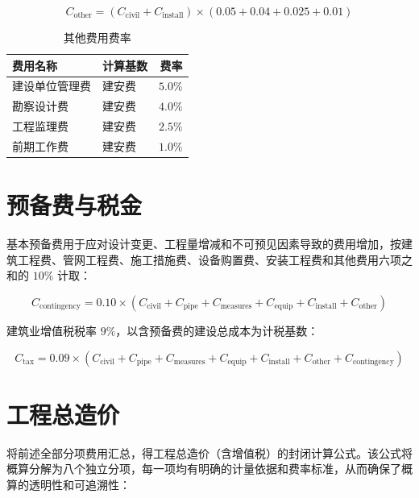 \documentclass[12pt,a4paper]{ctexart}
\begin{document}
\begin{equation}
C_{\text{other}} = (C_{\text{civil}} + C_{\text{install}}) \times (0.05 + 0.04 + 0.025 + 0.01)
\end{equation}

\begin{table}[htbp]
\centering
\caption{其他费用费率}
\label{tab:other_rates}
\begin{tabular}{llr}
\toprule
\textbf{费用名称} & \textbf{计算基数} & \textbf{费率} \\
\midrule
建设单位管理费 & 建安费 & $5.0\%$ \\
勘察设计费     & 建安费 & $4.0\%$ \\
工程监理费     & 建安费 & $2.5\%$ \\
前期工作费     & 建安费 & $1.0\%$ \\
\bottomrule
\end{tabular}
\end{table}

\section{预备费与税金}

基本预备费用于应对设计变更、工程量增减和不可预见因素导致的费用增加，按建筑工程费、管网工程费、施工措施费、设备购置费、安装工程费和其他费用六项之和的 $10\%$ 计取：

\begin{equation}
C_{\text{contingency}} = 0.10 \times (C_{\text{civil}} + C_{\text{pipe}} + C_{\text{measures}} + C_{\text{equip}} + C_{\text{install}} + C_{\text{other}})
\end{equation}

建筑业增值税税率 $9\%$，以含预备费的建设总成本为计税基数：

\begin{equation}
C_{\text{tax}} = 0.09 \times (C_{\text{civil}} + C_{\text{pipe}} + C_{\text{measures}} + C_{\text{equip}} + C_{\text{install}} + C_{\text{other}} + C_{\text{contingency}})
\end{equation}

\section{工程总造价}

将前述全部分项费用汇总，得工程总造价（含增值税）的封闭计算公式。该公式将概算分解为八个独立分项，每一项均有明确的计量依据和费率标准，从而确保了概算的透明性和可追溯性：
\end{document}
